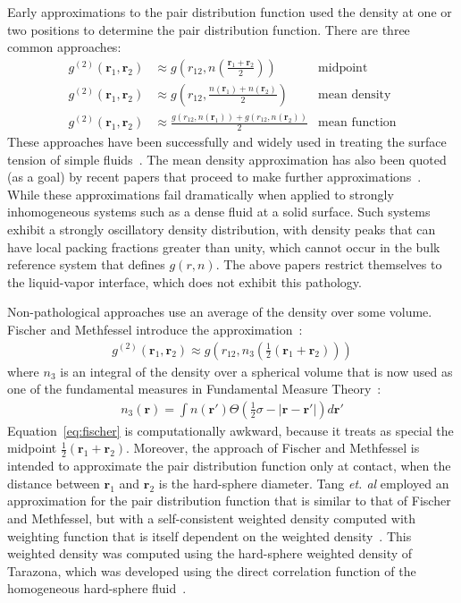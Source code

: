 \documentclass[letterpaper,twocolumn,amsmath,amssymb,pre,aps,10pt]{revtex4-1}
\newcommand{\rr}{\textbf{r}}
\begin{document}
Early approximations to the pair distribution function used the
density at one or two positions to determine the pair distribution
function.  There are three common approaches:
\begin{align}
  g^{(2)}(\rr_1,\rr_2) &\approx
  g\left(r_{12}, n\left(\frac{\rr_1+\rr_2}{2}\right)\right)
     & \text{midpoint} \\
  g^{(2)}(\rr_1,\rr_2) &\approx
  g\left(r_{12}, \frac{n(\rr_1)+n(\rr_2)}{2}\right)
     & \text{mean density} \\
  g^{(2)}(\rr_1,\rr_2) &\approx
  \frac{g(r_{12},n(\rr_1))+g(r_{12},n(\rr_2))}{2}
     & \text{mean function}
\end{align}
These approaches have been successfully and widely used in treating
the surface tension of simple fluids~\cite{pressing2003surface,
  salter2008statistical, bongiorno1975modified,
  toxvaerd1976hydrostatic, kalos1977structure, carey2008gradient,
  osborn1980monotonic, mccoy1981comparison, barrett2006some}.  The
mean density approximation has also been quoted (as a goal) by recent
papers that proceed to make further
approximations~\cite{gloor2007prediction, gross2009density}.  While
these approximations fail dramatically when applied to strongly
inhomogeneous systems such as a dense fluid at a solid surface.  Such
systems exhibit a strongly oscillatory density distribution, with
density peaks that can have local packing fractions greater than
unity, which cannot occur in the bulk reference system that defines
$g(r, n)$.  The above papers restrict themselves to the liquid-vapor
interface, which does not exhibit this pathology.

Non-pathological approaches use an average of the density over some
volume. Fischer and Methfessel introduce the
approximation~\cite{fischer1980born,harris1987comment}:
\begin{align}
  g^{(2)}(\rr_1,\rr_2) \approx g\left(r_{12}, n_3\left(\tfrac12
  (\rr_1+\rr_2)\right)\right)
  \label{eq:fischer}
\end{align}
where $n_3$ is an integral of the density over a spherical volume that
is now used as one of the fundamental measures in Fundamental
Measure Theory~\cite{rosenfeld1989free}:
\begin{align}
  n_3(\rr) = \int n(\rr')\Theta(\tfrac12 \sigma - |\rr-\rr'|) d\rr'
\end{align}
Equation~\ref{eq:fischer} is computationally awkward, because it
treats as special the midpoint $\tfrac12(\rr_1+\rr_2)$.  Moreover, the
approach of Fischer and Methfessel is intended to approximate the pair
distribution function only at contact, when the distance between
$\rr_1$ and $\rr_2$ is the hard-sphere diameter.
%
Tang \emph{et. al} employed an approximation for the pair distribution
function that is similar to that of Fischer and Methfessel, but with a
self-consistent weighted density computed with weighting function that
is itself dependent on the weighted density~\cite{tang1991density}.
This weighted density was computed using the hard-sphere weighted
density of Tarazona, which was developed using the direct correlation
function of the homogeneous hard-sphere fluid~\cite{tarazona1985free}.
\end{document}
